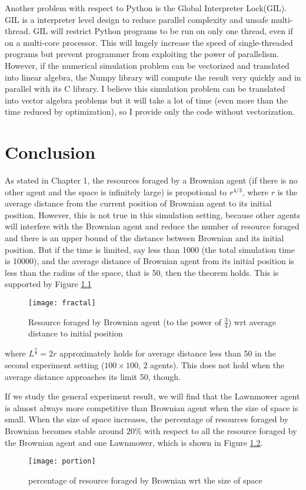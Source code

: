 \documentclass[a4paper, 12pt]{report}
\begin{document}
Another problem with respect to Python is the Global Interpreter Lock(GIL). GIL is a interpreter level design to reduce parallel complexity and unsafe multi-thread. GIL will restrict Python programs to be run on only one thread, even if on a multi-core processor. This will hugely increase the speed of single-threaded programs but prevent programmer from exploiting the power of parallelism. However, if the numerical simulation problem can be vectorized and translated into
linear algebra, the Numpy library will compute the result very quickly and in parallel with its C library. I believe this simulation problem can be translated into vector algebra problems but it will take a lot of time (even more than the time reduced by optimization), so I provide only the code without vectorization.

\chapter{Conclusion}

As stated in Chapter 1, the resources foraged by a Brownian agent (if there is no other agent and the space is infinitely large) is propotional to $r^{4/3}$, where $r$ is the average distance from the current position of Brownian agent to its initial position. However, this is not true in this simulation setting, because other agents will interfere with the Brownian agent and reduce the number of resource foraged and there is an upper bound of the distance between Brownian and
its initial position. But if the time is limited, say less than 1000 (the total
simulation time is 10000),  and the average distance of Brownian
agent from its initial position is less than the radius of the space, that is 50, then the theorem holds. This is supported by Figure \ref{fractal}
\begin{figure}[H]
    \centering
    \texttt{[image: fractal]}
    \caption{Resource foraged by Brownian agent (to the power of $ \frac{3}{4}$) wrt average distance to initial position}
    \label{fractal}
\end{figure}

where $L^{\frac{3}{4}}=2 r$ approximately holds for average distance less than 50 in the second experiment setting ($100\times100$, 2 agents). This does not hold when the average distance approaches its limit 50, though.

If we study the general experiment result, we will find that the Lawnmower agent is almost always more competitive than Brownian agent when the size of space is small. When the size of space increases, the percentage of resources foraged by Brownian becomes stable around 20\% with respect to all the resource foraged by the Brownian agent and one Lawnmower, which is shown in Figure \ref{portion}.
\begin{figure}[H]
    \centering
    \texttt{[image: portion]}
    \caption{percentage of resource foraged by Brownian wrt the size of space}
    \label{portion}
\end{figure}
\end{document}
